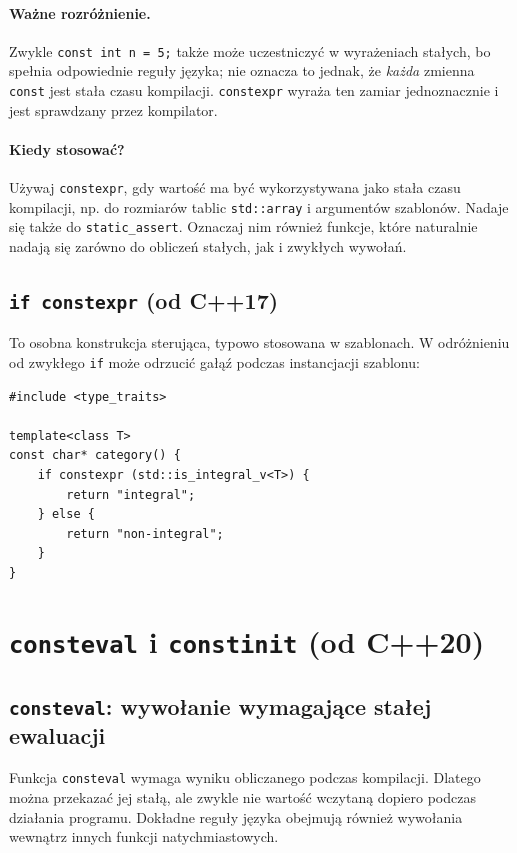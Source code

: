 \paragraph{Ważne rozróżnienie.}
Zwykle \texttt{const int n = 5;} także może uczestniczyć w wyrażeniach
stałych, bo spełnia odpowiednie reguły języka; nie oznacza to jednak,
że \emph{każda} zmienna \texttt{const} jest stała czasu kompilacji.
\texttt{constexpr} wyraża ten zamiar jednoznacznie i jest sprawdzany
przez kompilator.

\paragraph{Kiedy stosować?}
Używaj \texttt{constexpr}, gdy wartość ma być wykorzystywana jako stała
czasu kompilacji, np. do rozmiarów tablic \texttt{std::array} i argumentów
szablonów. Nadaje się także do \texttt{static\_assert}. Oznaczaj nim również
funkcje, które naturalnie nadają się zarówno do obliczeń stałych,
jak i zwykłych wywołań.

\subsection{\texttt{if constexpr} (od C++17)}

To osobna konstrukcja sterująca, typowo stosowana w szablonach.
W odróżnieniu od zwykłego \texttt{if} może odrzucić gałąź podczas
instancjacji szablonu:

\begin{lstlisting}
#include <type_traits>

template<class T>
const char* category() {
    if constexpr (std::is_integral_v<T>) {
        return "integral";
    } else {
        return "non-integral";
    }
}
\end{lstlisting}

\section{\texttt{consteval} i \texttt{constinit} (od C++20)}

\subsection{\texttt{consteval}: wywołanie wymagające stałej ewaluacji}

Funkcja \texttt{consteval} wymaga wyniku obliczanego podczas kompilacji.
Dlatego można przekazać jej stałą, ale zwykle nie wartość wczytaną
dopiero podczas działania programu. Dokładne reguły języka obejmują
również wywołania wewnątrz innych funkcji natychmiastowych.


